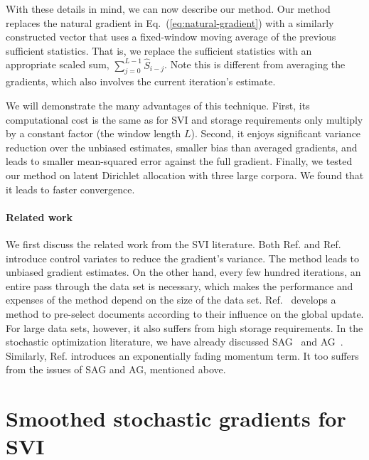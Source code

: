 \documentclass{article} %
\begin{document}
With these details in mind, we can now describe our method.  Our
method replaces the natural gradient in Eq.~(\ref{eq:natural-gradient})
with a similarly constructed vector that uses a fixed-window moving
average of the previous sufficient statistics.  That is, we replace
the sufficient statistics with an appropriate scaled sum,
$\sum_{j = 0}^{L-1} \hat{S}_{i - j}$.  Note this is different from averaging
the gradients, which also involves the current iteration's estimate.

We will demonstrate the many advantages of this technique. First, its
computational cost is the same as for SVI and storage
requirements only multiply by a constant factor (the window length
$L$). Second, it enjoys significant variance reduction over the
unbiased estimates, smaller bias than averaged gradients, and leads to
smaller mean-squared error against the full gradient.  Finally, we
tested our method on latent Dirichlet allocation with three large
corpora.  We found that it
leads to faster convergence.



\paragraph{Related work}
	We first discuss the related work from the SVI literature. Both Ref. \cite{JohnsonZhang} and Ref.~\cite{wang2013} introduce control variates to reduce the gradient's variance.
	The method leads to unbiased gradient estimates. On the other hand, every few hundred iterations, an entire pass through the data set is necessary, which makes
	the performance and expenses of the method depend on the size of the data set. Ref.~\cite{residualLDA} develops a method to pre-select documents according to their influence on the global update. For large data sets, however,
	it also suffers from high storage requirements.
	In the stochastic optimization literature, we have already
	discussed SAG~\cite{francisbach} and AG~\cite{nesterov2009}.
	Similarly, Ref. \cite{momentum} introduces an exponentially fading momentum term.
	It too suffers from the issues of SAG and AG, mentioned above.



\section{Smoothed stochastic gradients for SVI}
\end{document}
